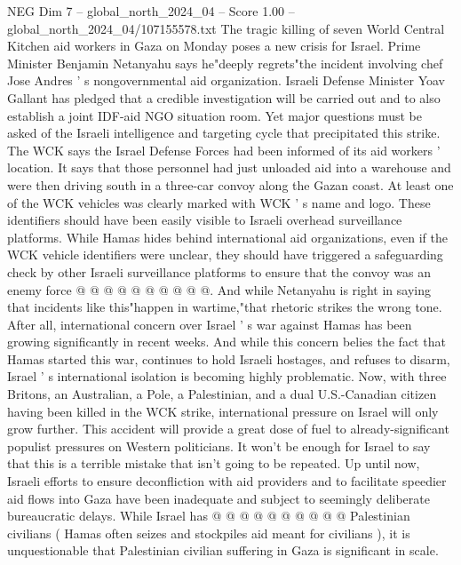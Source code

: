\begin{textsample}{NEG Dim 7 – global\_north\_2024\_04 – Score 1.00 – global\_north\_2024\_04/107155578.txt}  \label{ex:f7_neg_392}
The tragic killing of seven World Central Kitchen aid workers in Gaza on Monday poses a new crisis for Israel.
Prime Minister Benjamin Netanyahu says he"deeply regrets"the incident involving chef Jose Andres ' s nongovernmental aid organization.
Israeli Defense Minister Yoav Gallant has pledged that a credible investigation will be carried out and to also establish a joint IDF-aid NGO situation room.
Yet major questions must be asked of the Israeli intelligence and targeting cycle that precipitated this strike.
The WCK says the Israel Defense Forces had been informed of its aid workers ' location.
It says that those personnel had just unloaded aid into a warehouse and were then driving south in a three-car convoy along the Gazan coast.
At least one of the WCK vehicles was clearly marked with WCK ' s name and logo.
These identifiers should have been easily visible to Israeli overhead surveillance platforms.
While Hamas hides behind international aid organizations, even if the WCK vehicle identifiers were unclear, they should have triggered a safeguarding check by other Israeli surveillance platforms to ensure that the convoy was an enemy force @ @ @ @ @ @ @ @ @ @.
And while Netanyahu is right in saying that incidents like this"happen in wartime,"that rhetoric strikes the wrong tone.
After all, international concern over Israel ' s war against Hamas has been growing significantly in recent weeks.
And while this concern belies the fact that Hamas started this war, continues to hold Israeli hostages, and refuses to disarm, Israel ' s international isolation is becoming highly problematic.
Now, with three Britons, an Australian, a Pole, a Palestinian, and a dual U.S.-Canadian citizen having been killed in the WCK strike, international pressure on Israel will only grow further.
This accident will provide a great dose of fuel to already-significant populist pressures on Western politicians.
It won't be enough for Israel to say that this is a terrible mistake that isn't going to be repeated.
Up until now, Israeli efforts to ensure deconfliction with aid providers and to facilitate speedier aid flows into Gaza have been inadequate and subject to seemingly deliberate bureaucratic delays.
While Israel has @ @ @ @ @ @ @ @ @ @ Palestinian civilians ( Hamas often seizes and stockpiles aid meant for civilians ), it is unquestionable that Palestinian civilian suffering in Gaza is significant in scale.

\end{textsample}
